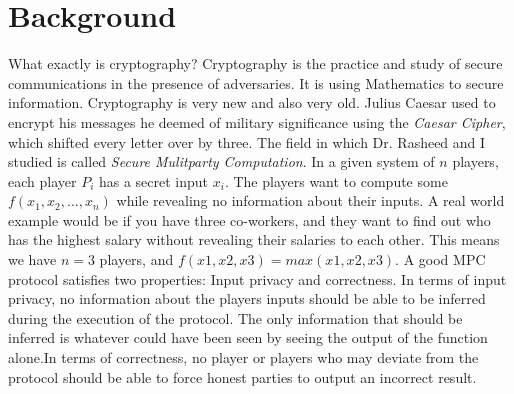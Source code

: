 \documentclass[12pt]{article}
\begin{document}
\section{Background}
What exactly is cryptography? Cryptography is the practice and study of secure communications in the presence of adversaries. It is using Mathematics to secure information. Cryptography is very new and also very old. Julius Caesar used to encrypt his messages he deemed of military significance using the \textit{Caesar Cipher}, which shifted every letter over by three. The field in which Dr. Rasheed and I studied is called \textit{Secure Mulitparty Computation}. In a given system of $n$ players, each player $P_i$ has a secret input $x_i$. The players want to compute some $f(x_1,x_2,...,x_n)$ while revealing no information about their inputs. A real world example would be if you have three co-workers, and they want to find out who has the highest salary without revealing their salaries to each other. This means we have $n=3$ players, and $f(x1,x2,x3) = max(x1,x2,x3)$. A good MPC protocol satisfies two properties: Input privacy and correctness. In terms of input privacy, no information about the players inputs should be able to be inferred during the execution of the protocol. The only information that should be inferred is whatever could have been seen by seeing the output of the function alone.In terms of correctness, no player or players who may deviate from the protocol should be able to force honest parties to output an incorrect result.  
\end{document}
